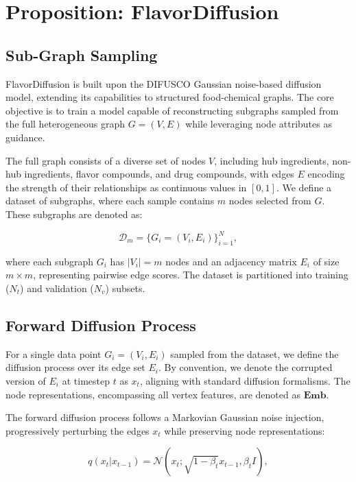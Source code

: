 \section{Proposition: FlavorDiffusion}

\subsection{Sub-Graph Sampling}

FlavorDiffusion is built upon the DIFUSCO Gaussian noise-based diffusion model, extending its capabilities to structured food-chemical graphs. The core objective is to train a model capable of reconstructing subgraphs sampled from the full heterogeneous graph \( G = (V, E) \) while leveraging node attributes as guidance. 

The full graph consists of a diverse set of nodes \( V \), including hub ingredients, non-hub ingredients, flavor compounds, and drug compounds, with edges \( E \) encoding the strength of their relationships as continuous values in \( [0,1] \). We define a dataset of subgraphs, where each sample contains \( m \) nodes selected from \( G \). These subgraphs are denoted as:

\begin{equation*}
    \mathcal{D}_m = \{ G_i = (V_i, E_i) \}_{i=1}^{N},
\end{equation*}

where each subgraph \( G_i \) has \( |V_i| = m \) nodes and an adjacency matrix \( E_i \) of size \( m \times m \), representing pairwise edge scores. The dataset is partitioned into training (\( N_t \)) and validation (\( N_v \)) subsets.

\subsection{Forward Diffusion Process}

For a single data point \( G_i = (V_i, E_i) \) sampled from the dataset, we define the diffusion process over its edge set \( E_i \). By convention, we denote the corrupted version of \( E_i \) at timestep \( t \) as \( x_t \), aligning with standard diffusion formalisms. The node representations, encompassing all vertex features, are denoted as \( \mathbf{Emb} \).

The forward diffusion process follows a Markovian Gaussian noise injection, progressively perturbing the edges \( x_t \) while preserving node representations:

\begin{equation*}
    q(x_t | x_{t-1}) = \mathcal{N}(x_t; \sqrt{1 - \beta_t} x_{t-1}, \beta_t I),
\end{equation*}

